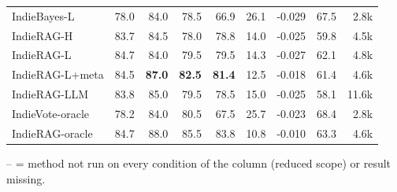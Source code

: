 \begin{table}[tbp]
\begin{tabular}{lrrrrrrrr}
IndieBayes-L & 78.0 & 84.0 & 78.5 & 66.9 & 26.1 & -0.029 & 67.5 & 2.8k \\
IndieRAG-H & 83.7 & 84.5 & 78.0 & 78.8 & 14.0 & -0.025 & 59.8 & 4.5k \\
IndieRAG-L & 84.7 & 84.0 & 79.5 & 79.5 & 14.3 & -0.027 & 62.1 & 4.8k \\
IndieRAG-L+meta & 84.5 & \textbf{87.0} & \textbf{82.5} & \textbf{81.4} & 12.5 & -0.018 & 61.4 & 4.6k \\
IndieRAG-LLM & 83.8 & 85.0 & 79.5 & 78.5 & 15.0 & -0.025 & 58.1 & 11.6k \\
\midrule
IndieVote-oracle & 78.2 & 84.0 & 80.5 & 67.5 & 25.7 & -0.023 & 68.4 & 2.8k \\
IndieRAG-oracle & 84.7 & 88.0 & 85.5 & 83.8 & 10.8 & -0.010 & 63.3 & 4.6k \\
\bottomrule
\end{tabular}
\par\smallskip\parbox{\linewidth}{\footnotesize -- = method not run on every condition of the column (reduced scope) or result missing.}
\end{table}
